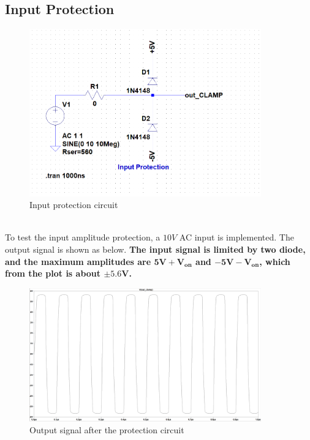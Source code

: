 \documentclass[pdftex,12pt,a4paper]{article}
\begin{document}
\subsection{Input Protection}
\begin{figure}[H]
\centering
\includegraphics[width=10cm]{Protect.png}
\caption{Input protection circuit}
\end{figure}
~\\
To test the input amplitude protection, a $10V$ AC input is implemented. The output signal is shown as below. \textbf{The input signal is limited by two diode, and the maximum amplitudes are $\mathbf{5V+V_{on}}$ and $\mathbf{-5V-V_{on}}$, which from the plot is about $\mathbf{\pm 5.6V}$.}
\begin{figure}[H]
\centering
\includegraphics[width=10cm]{proout.png}
\caption{Output signal after the protection circuit}
\end{figure}
\end{document}
